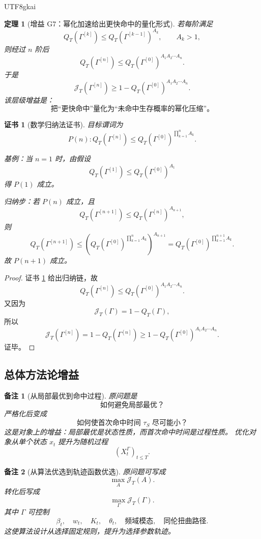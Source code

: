\documentclass[12pt]{article}
\newtheorem{theorem}{定理}[section]
\newtheorem{remark}{备注}[section]
\newtheorem{Certificate}{证书}[section]
\begin{document}
\begin{CJK*}{UTF8}{gkai}
\begin{theorem}[增益 G7：幂化加速给出更快命中的量化形式]
\label{thm:tex55-gain-power-acceleration}
若每阶满足
\[
  Q_T(\Gamma^{[k]})
  \le
  Q_T(\Gamma^{[k-1]})^{A_k},
  \qquad
  A_k>1,
\]
则经过 \(n\) 阶后
\[
  \boxed{
  Q_T(\Gamma^{[n]})
  \le
  Q_T(\Gamma^{[0]})^{A_1A_2\cdots A_n}.
  }
\]
于是
\[
  \boxed{
  \mathcal J_T(\Gamma^{[n]})
  \ge
  1-
  Q_T(\Gamma^{[0]})^{A_1A_2\cdots A_n}.
  }
\]
该层级增益是：
\[
  \boxed{
  \text{把“更快命中”量化为“未命中生存概率的幂化压缩”。}
  }
\]
\end{theorem}

\begin{Certificate}[数学归纳法证书]
\label{cert:tex55-gain-power-acceleration}
目标谓词为
\[
  P(n):
  Q_T(\Gamma^{[n]})
  \le
  Q_T(\Gamma^{[0]})^{\prod_{k=1}^{n}A_k}.
\]

基例：当 \(n=1\) 时，由假设
\[
  Q_T(\Gamma^{[1]})
  \le
  Q_T(\Gamma^{[0]})^{A_1}
\]
得 \(P(1)\) 成立。

归纳步：若 \(P(n)\) 成立，且
\[
  Q_T(\Gamma^{[n+1]})
  \le
  Q_T(\Gamma^{[n]})^{A_{n+1}},
\]
则
\[
  Q_T(\Gamma^{[n+1]})
  \le
  \left(
  Q_T(\Gamma^{[0]})^{\prod_{k=1}^{n}A_k}
  \right)^{A_{n+1}}
  =
  Q_T(\Gamma^{[0]})^{\prod_{k=1}^{n+1}A_k}.
\]
故 \(P(n+1)\) 成立。
\end{Certificate}

\begin{proof}
证书 \ref{cert:tex55-gain-power-acceleration} 给出归纳链，故
\[
  Q_T(\Gamma^{[n]})
  \le
  Q_T(\Gamma^{[0]})^{A_1A_2\cdots A_n}.
\]
又因为
\[
  \mathcal J_T(\Gamma)=1-Q_T(\Gamma),
\]
所以
\[
  \mathcal J_T(\Gamma^{[n]})
  =
  1-Q_T(\Gamma^{[n]})
  \ge
  1-
  Q_T(\Gamma^{[0]})^{A_1A_2\cdots A_n}.
\]
证毕。
\end{proof}

\subsection{总体方法论增益}
\label{subsec:tex55-gain-methodology}

\begin{remark}[从局部最优到命中过程]
原问题是
\[
  \text{如何避免局部最优？}
\]
严格化后变成
\[
  \text{如何使首次命中时间 }\tau_S\text{ 尽可能小？}
\]
这是对象上的增益：局部最优是状态性质，而首次命中时间是过程性质。
优化对象从单个状态 \(x_t\) 提升为随机过程
\[
  (X_t^\Gamma)_{t\le T}.
\]
\end{remark}

\begin{remark}[从算法优选到轨迹函数优选]
原问题可写成
\[
  \max_A\mathcal J_T(A).
\]
转化后写成
\[
  \max_\Gamma\mathcal J_T(\Gamma).
\]
其中 \(\Gamma\) 可控制
\[
  \beta_t,\quad
  w_t,\quad
  K_t,\quad
  \theta_t,\quad
  \text{频域模态},\quad
  \text{同伦扭曲路径}.
\]
这使算法设计从选择固定规则，提升为选择参数轨迹。
\end{remark}


\end{CJK*}
\end{document}
